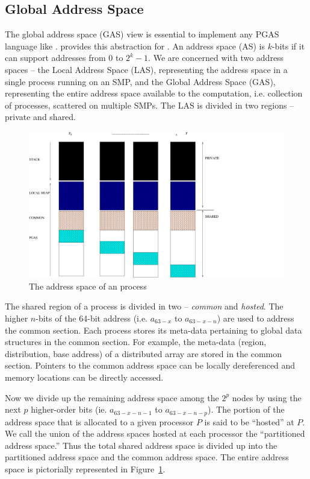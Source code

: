 \subsection {Global Address Space}
\label{sec:gas}

The global address space (GAS) view is essential to implement any PGAS
language like \Xten{}.\Xtenlib{} provides this abstraction for \Xten{}.
An address space (AS) is $k$-bits if it can support addresses from $0$
to $2^k-1$. We are concerned with two address spaces -- the Local
Address Space (LAS), representing the address space in a single process
running on an SMP, and the Global Address Space (GAS), representing the
entire address space available to the computation, i.e. collection of
processes, scattered on multiple SMPs. The LAS is divided in two regions
-- private and shared.


\begin{figure}
\center
\includegraphics[scale=0.5]{figs/gas.pdf}
\caption{\Xten{} The address space of an \Xtenlib{} process}
\label{fig:as_layout}
\end{figure}

The shared region of a process is divided in two -- {\em common} and
{\em hosted}. The higher $n$-bits of the 64-bit address (i.e. $a_{63-x}$
to $a_{63-x-n}$) are used to address the common section. Each process
stores its meta-data pertaining to global data structures in the common
section. For example, the meta-data (region, distribution, base address)
of a distributed array are stored in the common section. Pointers to the
common address space can be locally dereferenced and memory locations
can be directly accessed.

Now we divide up the remaining address space among the $2^p$ nodes by
using the next $p$ higher-order bits (ie. $a_{63-x-n-1}$ to
$a_{63-x-n-p}$). The portion of the address space that is allocated to a
given processor $P$ is said to be ``hosted'' at $P$. We call the union
of the address spaces hosted at each processor the ``partitioned address
space.'' Thus the total shared address space is divided up into the
partitioned address space and the common address space. The entire
address space is pictorially represented in Figure~\ref{fig:as_layout}. 

